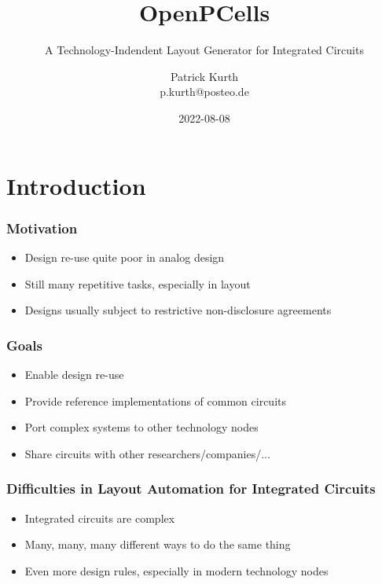 \documentclass[aspectratio=169, dvipsnames, x11names, svgnames, 11pt]{beamer}
\title{OpenPCells}
\subtitle{A Technology-Indendent Layout Generator for Integrated Circuits}
\author{Patrick Kurth\\p.kurth@posteo.de}
\date{2022-08-08}
\begin{document}
\maketitle

\section{Introduction}

\begin{frame}
    \frametitle{Motivation}
    \begin{itemize}
        \item Design re-use quite poor in analog design
        \item Still many repetitive tasks, especially in layout
        \item Designs usually subject to restrictive non-disclosure agreements
    \end{itemize}
\end{frame}

\begin{frame}
    \frametitle{Goals}
    \begin{itemize}
        \item Enable design re-use
        \item Provide reference implementations of common circuits
        \item Port complex systems to other technology nodes
        \item Share circuits with other researchers/companies/...
    \end{itemize}
\end{frame}

\begin{frame}
    \frametitle{Difficulties in Layout Automation for Integrated Circuits}
    \begin{itemize}
        \item Integrated circuits are complex
        \item Many, many, many different ways to do the same thing
        \item Even more design rules, especially in modern technology nodes
    \end{itemize}
\end{frame}
\end{document}
